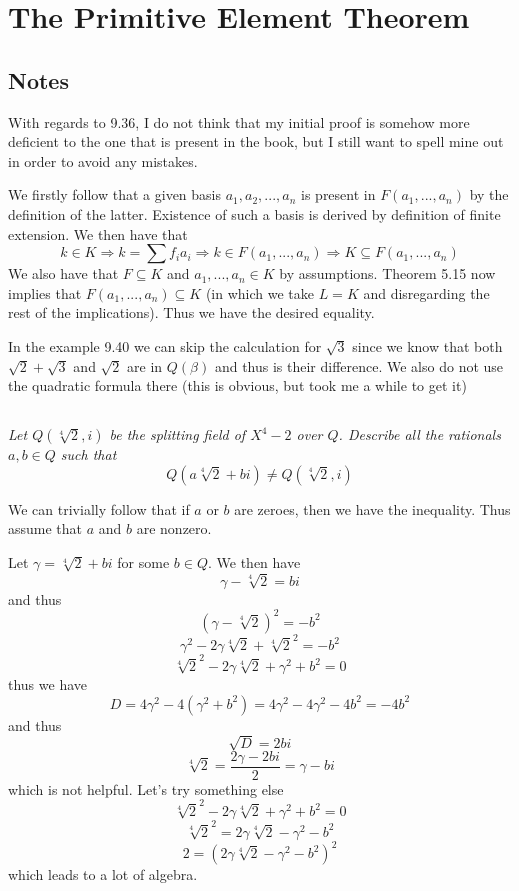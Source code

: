 \documentclass[11pt,oneside,titlepage]{book}
\DeclareMathOperator \ra {\Rightarrow}
\begin{document}
\section{The Primitive Element Theorem}

\subsection*{Notes}

With regards to 9.36, I do not think that my initial proof is somehow
more deficient to the one that is present in the book, but I still
want to spell mine out in order to avoid any mistakes.

We firstly follow that a given basis $a_1, a_2, ..., a_n$ is present
in $F(a_1, ..., a_n)$ by the definition of the latter. Existence of
such a basis is derived by definition of finite extension.  We then
have that
$$k \in K \ra k = \sum{f_i a_i} \ra
k \in F(a_1, ..., a_n) \ra K \subseteq F(a_1, ..., a_n)$$
We also have that $F \subseteq K$ and $a_1, ..., a_n \in K$ by
assumptions. Theorem 5.15 now implies that $F(a_1, ..., a_n) \subseteq K$
(in which we take $L = K$ and disregarding the rest of the implications).
Thus we have the desired equality.

In the example 9.40 we can skip the calculation for $\sqrt{3}$ since
we know that both $\sqrt{2} + \sqrt{3}$ and $\sqrt{2}$ are in $Q(\beta)$
and thus is their difference. We also do not use the quadratic formula
there (this is obvious, but took me a while to get it)

\subsection{}

\textit{Let $Q(\sqrt[4]{2}, i)$ be the splitting field of $X^4 - 2$
  over $Q$. Describe all the rationals $a, b \in Q$ such that
  $$Q(a\sqrt[4]{2} + bi) \neq Q(\sqrt[4]{2}, i)$$
}

We can trivially follow that if $a$ or $b$ are zeroes, then we have
the inequality. Thus assume that $a$ and $b$ are nonzero.

Let $\gamma = \sqrt[4]{2} + bi$ for some $b \in Q$.
We then have
$$\gamma - \sqrt[4]{2} = bi$$
and thus
$$(\gamma - \sqrt[4]{2})^2 = -b^2$$
$$\gamma^2 - 2 \gamma \sqrt[4]{2} + \sqrt[4]{2}^2 = -b^2$$
$$\sqrt[4]{2}^2 - 2 \gamma \sqrt[4]{2} + \gamma^2 + b^2 = 0$$
thus we have
$$D = 4 \gamma^2 - 4 (\gamma^2 + b^2) = 4 \gamma^2 - 4 \gamma^2 - 4b^2 = -4b^2$$
and thus
$$\sqrt{D} = 2b i$$
$$\sqrt[4]{2} = \frac{2\gamma - 2bi}{2} = \gamma - bi$$
which is not helpful. Let's try something else
$$\sqrt[4]{2}^2 - 2 \gamma \sqrt[4]{2} + \gamma^2 + b^2 = 0$$
$$\sqrt[4]{2}^2 = 2 \gamma \sqrt[4]{2} - \gamma^2 - b^2$$
$$2 = (2 \gamma \sqrt[4]{2} - \gamma^2 - b^2)^2$$
which leads to a lot of algebra.
\end{document}
